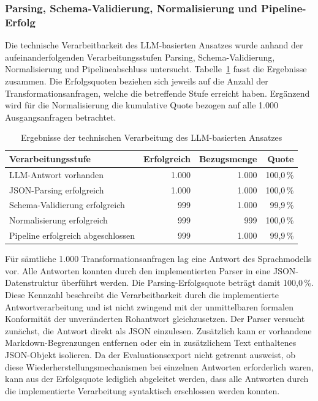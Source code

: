 \subsubsection{Parsing, Schema-Validierung, Normalisierung und Pipeline-Erfolg}

Die technische Verarbeitbarkeit des LLM-basierten Ansatzes wurde anhand der aufeinanderfolgenden Verarbeitungsstufen Parsing, Schema-Validierung, Normalisierung und Pipelineabschluss untersucht. Tabelle~\ref{tab:technische-verarbeitbarkeit} fasst die Ergebnisse zusammen. Die Erfolgsquoten beziehen sich jeweils auf die Anzahl der Transformationsanfragen, welche die betreffende Stufe erreicht haben. Ergänzend wird für die Normalisierung die kumulative Quote bezogen auf alle 1.000 Ausgangsanfragen betrachtet.

\begin{table}[htbp]
    \centering
    \small
    \begin{tabular}{p{} r r r}
        \hline
        \textbf{Verarbeitungsstufe} &
        \textbf{Erfolgreich} &
        \textbf{Bezugsmenge} &
        \textbf{Quote} \\
        \hline
        LLM-Antwort vorhanden & 1.000 & 1.000 & 100,0\,\% \\
        JSON-Parsing erfolgreich & 1.000 & 1.000 & 100,0\,\% \\
        Schema-Validierung erfolgreich & 999 & 1.000 & 99,9\,\% \\
        Normalisierung erfolgreich & 999 & 999 & 100,0\,\% \\
        Pipeline erfolgreich abgeschlossen & 999 & 1.000 & 99,9\,\% \\
        \hline
    \end{tabular}
    \caption{Ergebnisse der technischen Verarbeitung des LLM-basierten Ansatzes}
    \label{tab:technische-verarbeitbarkeit}
\end{table}

Für sämtliche 1.000 Transformationsanfragen lag eine Antwort des Sprachmodells vor. Alle Antworten konnten durch den implementierten Parser in eine JSON-Datenstruktur überführt werden. Die Parsing-Erfolgsquote beträgt damit 100,0\,\%. Diese Kennzahl beschreibt die Verarbeitbarkeit durch die implementierte Antwortverarbeitung und ist nicht zwingend mit der unmittelbaren formalen Konformität der unveränderten Rohantwort gleichzusetzen. Der Parser versucht zunächst, die Antwort direkt als JSON einzulesen. Zusätzlich kann er vorhandene Markdown-Begrenzungen entfernen oder ein in zusätzlichem Text enthaltenes JSON-Objekt isolieren. Da der Evaluationsexport nicht getrennt ausweist, ob diese Wiederherstellungsmechanismen bei einzelnen Antworten erforderlich waren, kann aus der Erfolgsquote lediglich abgeleitet werden, dass alle Antworten durch die implementierte Verarbeitung syntaktisch erschlossen werden konnten.

